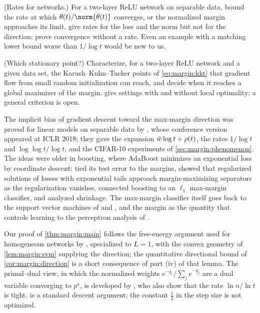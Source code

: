 \begin{refsection}
\begin{exercises}
\item \research (Rates for networks.) For a two-layer ReLU network on separable data, bound the rate at which $\theta(t)/\norm{\theta(t)}$ converges, or the normalized margin approaches its limit. \Textcite{LyuLi2020} give rates for the loss and the norm but not for the direction; \textcite{JiTelgarsky2020} prove convergence without a rate. Even an example with a matching lower bound worse than $1/\log t$ would be new to us. \label{ex:margin:rates}

\item \research (Which stationary point?) Characterize, for a two-layer ReLU network and a given data set, the Karush--Kuhn--Tucker points of \eqref{eq:margin:kkt} that gradient flow from small random initialization can reach, and decide when it reaches a global maximizer of the margin. \Textcite{VardiShamirSrebro2022} give settings with and without local optimality; a general criterion is open. \label{ex:margin:which}
\end{exercises}

\notesandrefs
The implicit bias of gradient descent toward the max-margin direction was proved for linear models on separable data by \textcite{SoudryEtAl2018}, whose conference version appeared at ICLR 2018; they gave the expansion $\hat w\log t+\rho(t)$, the rates $1/\log t$ and $\log\log t/\log t$, and the CIFAR-10 experiments of \cref{sec:margin:phenomenon}. The ideas were older in boosting, where AdaBoost minimizes an exponential loss by coordinate descent: \textcite{SchapireEtAl1998} tied its test error to the margins, \textcite{RossetZhuHastie2003} showed that regularized solutions of losses with exponential tails approach margin-maximizing separators as the regularization vanishes, \textcite{RossetZhuHastie2004} connected boosting to an $\ell_1$ max-margin classifier, and \textcite{Telgarsky2013} analyzed shrinkage. The max-margin classifier itself goes back to the support vector machines of \textcite{BoserGuyonVapnik1992} and \textcite{CortesVapnik1995}, and the margin as the quantity that controls learning to the perceptron analysis of \textcite{Novikoff1962}.

Our proof of \cref{thm:margin:main} follows the free-energy argument used for homogeneous networks by \textcite{LyuLi2020}, specialized to $L=1$, with the convex geometry of \cref{lem:margin:svm} supplying the direction; the quantitative directional bound of \cref{cor:margin:direction} is a short consequence of part (iv) of that lemma. The primal--dual view, in which the normalized weights $e^{-q_i}/\sum_je^{-q_j}$ are a dual variable converging to $p^\star$, is developed by \textcite{JiTelgarsky2021}, who also show that the rate $\ln n/\ln t$ is tight.  is a standard descent argument; the constant $\frac12$ in the step size is not optimized.


\end{refsection}
